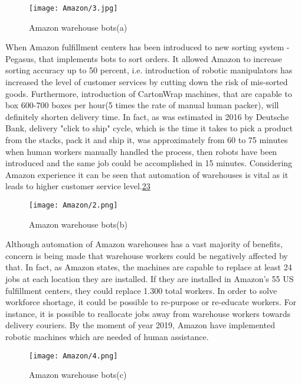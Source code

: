 \documentclass[thesis=B,english]{FITthesis}[2019/12/23]
\begin{document}
\begin{figure}
	\texttt{[image: Amazon/3.jpg]}
	\caption[Amazon warehouse bots(a)]{Amazon warehouse bots(a)}\label{fig:float44}
\end{figure}

When Amazon fulfillment centers has been introduced to new sorting system - Pegasus, that implements bots to sort orders. It allowed Amazon to increase sorting accuracy up to 50 percent, i.e. introduction of robotic manipulators has increased the level of customer services by cutting down the risk of mis-sorted goods. Furthermore, introduction of CartonWrap machines, that are capable to box 600-700 boxes per hour(5 times the rate of manual human packer), will definitely shorten delivery time. In fact, as was estimated in 2016 by Deutsche Bank, delivery "click to ship" cycle, which is the time it takes to pick a product from the stacks, pack it and ship it, was approximately from 60 to 75 minutes when human workers manually handled the process, then robots have been introduced and the same job could be accomplished in 15 minutes. Considering Amazon experience it can be seen that automation of warehouses is vital as it leads to higher customer service level.\ref{fig:float45}\ref{fig:float46}
\begin{figure}
	\texttt{[image: Amazon/2.png]}
	\caption[Amazon warehouse bots(b)]{Amazon warehouse bots(b)}\label{fig:float45}
\end{figure}


Although automation of Amazon warehouses has a vast majority of benefits, concern is being made that warehouse workers could be negatively affected by that. In fact, as Amazon states, the machines are capable to replace at least 24 jobs at each location they are installed. If they are installed in Amazon's 55 US fulfillment centers, they could replace 1.300 total workers. In order to solve workforce shortage, it could be possible to re-purpose or re-educate workers. For instance, it is possible to reallocate jobs away from warehouse workers towards delivery couriers. By the moment of year 2019, Amazon have implemented robotic machines which are needed of human assistance.\cite{bib_8}

\begin{figure}
	\texttt{[image: Amazon/4.png]}
	\caption[Amazon warehouse bots(c)]{Amazon warehouse bots(c)}\label{fig:float46}
\end{figure}
\end{document}
